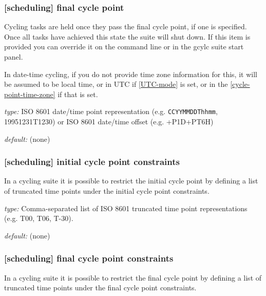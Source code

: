 \subsubsection[final cycle point]{[scheduling] \textrightarrow final cycle point}

Cycling tasks are held once they pass the final cycle point, if one is
specified. Once all tasks have achieved this state the suite will shut
down. If this item is provided you can override it on the command line
or in the gcylc suite start panel.

In date-time cycling, if you do not provide time zone information for this,
it will be assumed to be local time, or in UTC if \ref{UTC-mode} is set, or in
the \ref{cycle-point-time-zone} if that is set.

\begin{myitemize}
    \item {\em type:} ISO 8601 date/time point representation (e.g.
 \lstinline=CCYYMMDDThhmm=, 19951231T1230) or ISO 8601 date/time offset
    (e.g. +P1D+PT6H)
    \item {\em default:} (none)
\end{myitemize}

\subsubsection[initial cycle point constraints]{[scheduling] \textrightarrow initial cycle point constraints}
\label{initial cycle point constraints}

In a cycling suite it is possible to restrict the initial cycle point by
defining a list of truncated time points under the initial cycle point
constraints.

\begin{myitemize}
    \item {\em type:} Comma-separated list of ISO 8601 truncated time point
        representations (e.g. T00, T06, T-30).
    \item {\em default:} (none)
\end{myitemize}

\subsubsection[final cycle point constraints]{[scheduling] \textrightarrow final cycle point constraints}
\label{final cycle point constraints}

In a cycling suite it is possible to restrict the final cycle point by
defining a list of truncated time points under the final cycle point
constraints.

